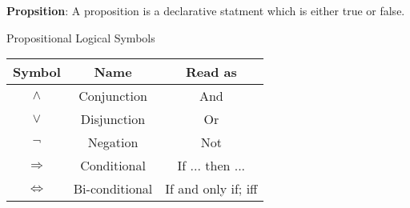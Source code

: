 \begin{defn}\label{mod1:defn:Proposition}
   \textbf{Propsition}: A proposition is a declarative statment which is either true or false.
\end{defn}

\begin{defn}\label{mod1:defn:LogicSymbols}
   Propositional Logical Symbols
      
   \begin{table}[ht]
      \centering
      \begin{tabular}{|c|c|c|}
         \hline
            Symbol & Name & Read as\\
         \hline
         $\land$ & Conjunction & And \\
         $\lor$ &   Disjunction & Or \\
         $\lnot$ & Negation & Not\\
         $\Rightarrow$ & Conditional & If ... then ...\\
         $\Leftrightarrow$ & Bi-conditional & If and only if; iff\\
         \hline
      \end{tabular}
      \label{mod1:tab:LogicSymbols}
   \end{table}

\end{defn}      

